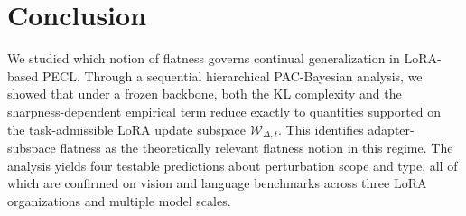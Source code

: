 \documentclass[10pt]{article} %
\begin{document}



\section{Conclusion}
\label{sec:conclusion}

We studied which notion of flatness governs continual generalization in LoRA-based PECL.
Through a sequential hierarchical PAC-Bayesian analysis, we showed that under a frozen backbone, both the KL complexity and the sharpness-dependent empirical term reduce exactly to quantities supported on the task-admissible LoRA update subspace $\mathcal{W}_{\Delta,t}$.
This identifies adapter-subspace flatness as the theoretically relevant flatness notion in this regime.
The analysis yields four testable predictions about perturbation scope and type, all of which are confirmed on vision and language benchmarks across three LoRA organizations and multiple model scales.
\end{document}
